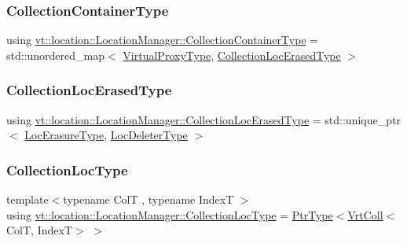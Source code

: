 \subsubsection{\texorpdfstring{Collection\+Container\+Type}{CollectionContainerType}}
{\footnotesize\ttfamily using \hyperlink{structvt_1_1location_1_1_location_manager_a03472723aecf57cd99cd221ef2164edb}{vt\+::location\+::\+Location\+Manager\+::\+Collection\+Container\+Type} =  std\+::unordered\+\_\+map$<$ \hyperlink{namespacevt_a1b417dd5d684f045bb58a0ede70045ac}{Virtual\+Proxy\+Type}, \hyperlink{structvt_1_1location_1_1_location_manager_a590e246bdfa380ef31e7aee4f4d51442}{Collection\+Loc\+Erased\+Type} $>$}

\mbox{\label{structvt_1_1location_1_1_location_manager_a590e246bdfa380ef31e7aee4f4d51442}} 
\subsubsection{\texorpdfstring{Collection\+Loc\+Erased\+Type}{CollectionLocErasedType}}
{\footnotesize\ttfamily using \hyperlink{structvt_1_1location_1_1_location_manager_a590e246bdfa380ef31e7aee4f4d51442}{vt\+::location\+::\+Location\+Manager\+::\+Collection\+Loc\+Erased\+Type} =  std\+::unique\+\_\+ptr$<$ \hyperlink{structvt_1_1location_1_1_location_manager_a0c153c55a8938e99fad5386699653220}{Loc\+Erasure\+Type}, \hyperlink{structvt_1_1location_1_1_location_manager_ab0ce8907fcf9b36cf884af08c744ddb1}{Loc\+Deleter\+Type} $>$}

\mbox{\label{structvt_1_1location_1_1_location_manager_aa4b146a9cf55cf5ec92b2b0f5e6d7cf4}} 
\subsubsection{\texorpdfstring{Collection\+Loc\+Type}{CollectionLocType}}
{\footnotesize\ttfamily template$<$typename ColT , typename IndexT $>$ \\
using \hyperlink{structvt_1_1location_1_1_location_manager_aa4b146a9cf55cf5ec92b2b0f5e6d7cf4}{vt\+::location\+::\+Location\+Manager\+::\+Collection\+Loc\+Type} =  \hyperlink{structvt_1_1location_1_1_location_manager_a32d8bca6ed6909a2190286408335d3b4}{Ptr\+Type}$<$\hyperlink{structvt_1_1location_1_1_location_manager_a189fc3b436520c19aada9623a6b4a42e}{Vrt\+Coll}$<$ColT, IndexT$>$ $>$}

